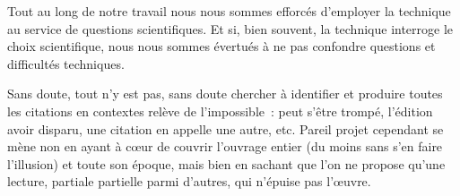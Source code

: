 \documentclass[12pt, a4paper]{article}
\begin{document}
Tout au long de notre travail nous nous sommes efforcés d'employer la technique au service de questions scientifiques. Et si, bien souvent, la technique interroge le choix scientifique, nous nous sommes évertués à ne pas confondre questions et difficultés techniques. 

Sans doute, tout n'y est pas, sans doute chercher à identifier et produire toutes les citations en contextes relève de l'impossible~: \robbe{} peut s'être trompé, l'édition avoir disparu, une citation en appelle une autre, etc. Pareil projet cependant se mène non en ayant à cœur de couvrir l'ouvrage entier (du moins sans s'en faire l'illusion) et toute son époque, mais bien en sachant que l'on ne propose qu'une lecture, partiale partielle parmi d'autres, qui n'épuise pas l'œuvre.
\end{document}
